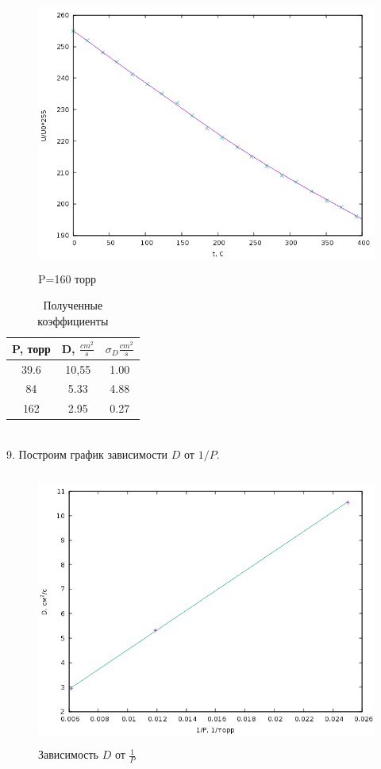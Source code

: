 \documentclass[a4paper]{article}
\begin{document}
	 \begin{figure}[h!]
		\centering
		\includegraphics[height=90mm]{plot3.png}
		\caption{P=160 торр\label{overflow}}
	 \end{figure}
	 \begin{table}[h!]
 		\centering
		\begin{tabular}{| c | c | c |}
    		\hline
    		P, торр & D, $\frac{cm^2}{s}$ & $\sigma _D \frac{cm^2}{s}$ \\
    		\hline
    		39.6 & 10,55 & 1.00 \\
    		\hline
    		84 & 5.33 & 4.88 \\
    		\hline
    		162 & 2.95 & 0.27 \\
    		\hline
    	\end{tabular}
  		\caption{Полученные коэффициенты}
	\end{table}\\
	9. Построим график зависимости $D$ от $1/P$.
	\begin{figure}[h!]
		\centering
		\includegraphics[height=90mm]{plot4.png}
		\caption{Зависимость $D$ от $\frac{1}{P}$\label{overflow}}
	 \end{figure}\\
\end{document}
